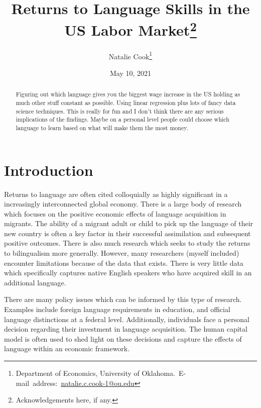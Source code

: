\documentclass[12pt,english]{article}
\begin{document}
\begin{singlespace}
\title{Returns to Language Skills in the US Labor Market\thanks{Acknowledgements here, if any.}}
\end{singlespace}

\author{Natalie Cook\thanks{Department of Economics, University of Oklahoma.\
E-mail~address:~\href{mailto:student.name@ou.edu}{natalie.c.cook-1@ou.edu}}}

\date{May 10, 2021}

\maketitle

\begin{abstract}
\begin{singlespace}
Figuring out which language gives you the biggest wage increase in the US holding as much other stuff constant as possible. Using linear regression plus lots of fancy data science techniques. This is really for fun and I don't think there are any serious implications of the findings. Maybe on a personal level people could choose which language to learn based on what will make them the most money. 
\end{singlespace}

\end{abstract}
\vfill{}


\pagebreak{}


\section{Introduction}\label{sec:intro}
Returns to language are often cited colloquially as highly significant in a increasingly interconnected global economy. There is a large body of research which focuses on the positive economic effects of language acquisition in migrants. The ability of a migrant adult or child to pick up the language of their new country is often a key factor in their successful assimilation and subsequent positive outcomes. There is also much research which seeks to study the returns to bilingualism more generally. However, many researchers (myself included) encounter limitations because of the data that exists. There is very little data which specifically captures native English speakers who have acquired skill in an additional language.  

There are many policy issues which can be informed by this type of research. Examples include foreign language requirements in education, and official language distinctions at a federal level. Additionally, individuals face a personal decision regarding their investment in language acquisition. The human capital model is often used to shed light on these decisions and capture the effects of language within an economic framework. 
\end{document}
